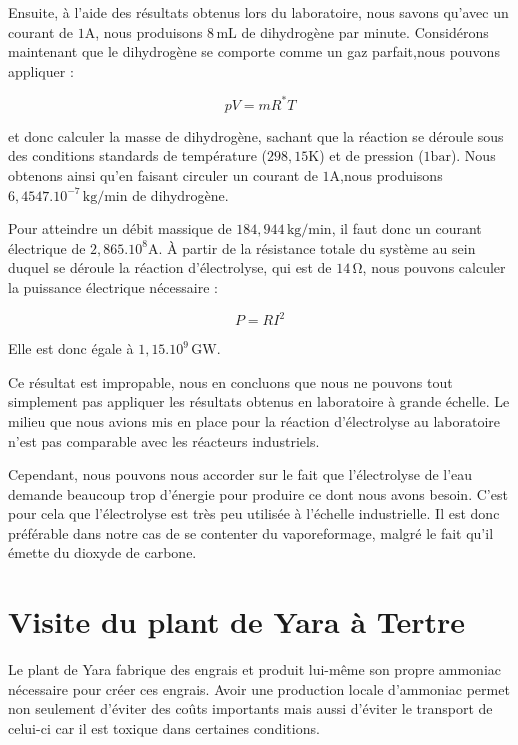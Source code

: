 \documentclass[a4paper, oneside, 12pt]{article}
\begin{document}
Ensuite, à l'aide des résultats obtenus lors du laboratoire, nous savons qu'avec un courant de $1 \si{\ampere}$, nous produisons $8 \, \si{\milli\liter}$ de dihydrogène par minute. Considérons maintenant que le dihydrogène se comporte comme un gaz parfait,nous pouvons appliquer :

\begin{equation*}
	pV = mR^{*}T
\end{equation*}

et donc calculer la masse de dihydrogène, sachant que la réaction se déroule sous des conditions standards de température ($298,15 \si{\kelvin}$) et de pression ($1 \si{\bar}$). Nous obtenons ainsi qu'en faisant circuler un courant de $1 \si{\ampere}$,nous produisons $6,4547.10^{-7} \, \si{\kilo\gram/\minute}$ de dihydrogène.

Pour atteindre un débit massique de $184,944 \, \si{\kilo\gram/\minute}$, il faut donc un courant électrique de $2,865.10^8 \si{\ampere}$. À partir de la résistance
totale du système au sein duquel se déroule la réaction d'électrolyse, qui est de $14 \, \si{\ohm}$, nous pouvons calculer la puissance électrique nécessaire : 

\begin{equation*}
	P = RI^{2}
\end{equation*}

Elle est donc égale à $1,15.10^9 \, \si{\giga\watt}$.

Ce résultat est impropable, nous en concluons que nous ne pouvons tout simplement pas appliquer les résultats obtenus en laboratoire à grande échelle. Le milieu que nous avions mis en place pour la réaction d'électrolyse au laboratoire n'est pas comparable avec les réacteurs industriels.

Cependant, nous pouvons nous accorder sur le fait que l'électrolyse de l'eau demande beaucoup trop d'énergie pour produire ce dont nous avons besoin. C'est pour cela que l'électrolyse est très peu 
utilisée à l'échelle industrielle. Il est donc préférable dans notre cas de se contenter du vaporeformage, malgré le fait qu'il émette du dioxyde de carbone.

\section{Visite du plant de Yara à Tertre}

Le plant de Yara fabrique des engrais et produit lui-même son propre ammoniac nécessaire pour créer ces engrais. Avoir une production locale d'ammoniac permet non seulement 
d'éviter des coûts importants mais aussi d'éviter le transport de celui-ci car il est toxique dans certaines conditions.
\end{document}
